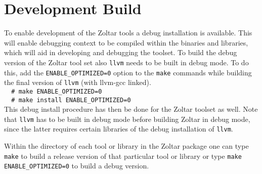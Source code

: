 \section{Development Build}
  
To enable development of the Zoltar tools a debug installation is available.
This will enable debugging context to be compiled within the binaries and libraries,
which will aid in developing and debugging the toolset.
To build the debug version of the Zoltar tool set
also \verb|llvm| needs to be built in debug mode.
To do this, add the \verb|ENABLE_OPTIMIZED=0| option to the \verb|make|
commands while building the final version of \verb|llvm| (with llvm-gcc linked).\\
\verb|  # make ENABLE_OPTIMIZED=0| \\
\verb|  # make install ENABLE_OPTIMIZED=0| \\
This debug install procedure has then be done for the Zoltar toolset as well.
Note that \verb|llvm| has to be built in debug mode before building Zoltar in debug mode,
since the latter requires certain libraries of the debug installation of \verb|llvm|.

Within the directory of each tool or library in the Zoltar package one can type
\verb|make| to build a release version of that particular tool or library or type
\verb|make ENABLE_OPTIMIZED=0| to build a debug version.


